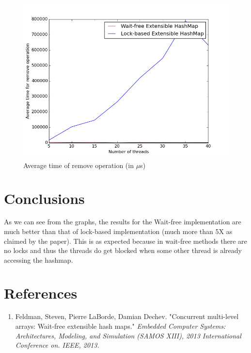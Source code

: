 \documentclass[a4paper,10pt]{article}
\begin{document}
\begin{figure}[H]
 \includegraphics[width=\linewidth]{remove.png}
 \caption{Average time of remove operation (in $\mu$s)}
\end{figure}

\section{Conclusions}
As we can see from the graphs, the results for the Wait-free implementation are much better than that of
lock-based implementation (much more than 5X as claimed by the paper). This is as expected because in wait-free methods
there are no locks and thus the threads do get blocked when some other thread is already accessing the hashmap.
\section{References}
\begin{enumerate}
 \item Feldman, Steven, Pierre LaBorde, Damian Dechev. "Concurrent multi-level arrays: Wait-free extensible hash maps."
 \textit{Embedded Computer Systems: Architectures, Modeling, and Simulation (SAMOS XIII), 2013 International Conference on. IEEE, 2013.}
\end{enumerate}
\end{document}
